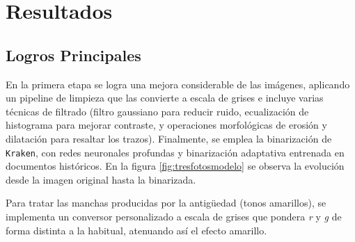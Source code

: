 \documentclass[11pt,a4paper]{article}
\begin{document}
\section{Resultados}
\subsection{Logros Principales}

En la primera etapa se logra una mejora considerable de las imágenes, aplicando un pipeline de limpieza que las convierte a escala de grises e incluye varias técnicas de filtrado (filtro gaussiano para reducir ruido, ecualización de histograma para mejorar contraste, y operaciones morfológicas de erosión y dilatación para resaltar los trazos). Finalmente, se emplea la binarización de \texttt{Kraken}, con redes neuronales profundas y binarización adaptativa entrenada en documentos históricos. En la figura \ref{fig:tresfotosmodelo} se observa la evolución desde la imagen original hasta la binarizada.

Para tratar las manchas producidas por la antigüedad (tonos amarillos), se implementa un conversor personalizado a escala de grises que pondera \textit{r} y \textit{g} de forma distinta a la habitual, atenuando así el efecto amarillo.
\end{document}
